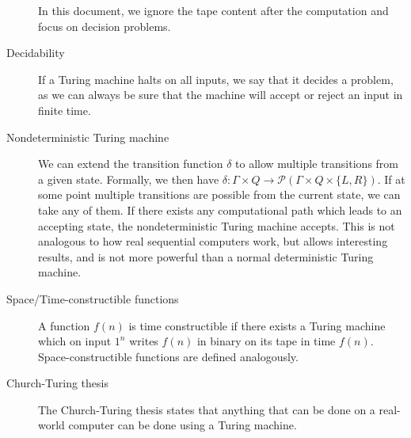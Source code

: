 \begin{description}
    In this document, we ignore the tape content after the computation and focus on decision problems.
    \item[Decidability] If a Turing machine halts on all inputs, we say that it decides a problem, as we can always be sure that the machine will accept or reject an input in finite time.
    \item[Nondeterministic Turing machine] We can extend the transition function $\delta$ to allow multiple transitions from a given state.
    Formally, we then have $\delta : \Gamma \times Q \to \mathcal{P}(\Gamma \times Q \times \{L, R\})$.
    If at some point multiple transitions are possible from the current state, we can take any of them.
    If there exists any computational path which leads to an accepting state, the nondeterministic Turing machine accepts.
    This is not analogous to how real sequential computers work, but allows interesting results, and is not more powerful than a normal deterministic Turing machine.
    \item[Space/Time-constructible functions] A function $f(n)$ is time constructible if there exists a Turing machine which on input $1^{n}$ writes $f(n)$ in binary on its tape in time $f(n)$.
    Space-constructible functions are defined analogously.
    \item[Church-Turing thesis] The Church-Turing thesis states that anything that can be done on a real-world computer can be done using a Turing machine.
\end{description}
